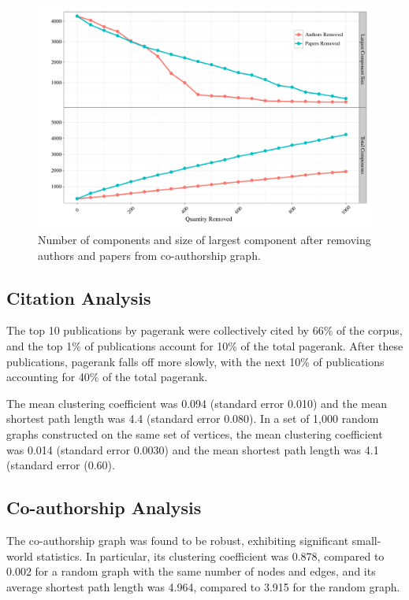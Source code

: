 \documentclass[5p]{elsarticle}
\begin{document}
\begin{figure}
  \begin{center}
    \includegraphics[width=\linewidth]{figures/connected_after_removing}%
    \caption{Number of components and size of largest component after removing authors and papers from co-authorship graph.
        \label{fig:connected_after_removing}
    }
  \end{center}
\end{figure}

\subsection{Citation Analysis} 
The top 10 publications by pagerank were collectively cited by 66\% of the
corpus, and the top 1\% of publications account for 10\% of the total
pagerank.  After these publications, pagerank falls off more slowly, with
the next 10\% of publications accounting for 40\% of the total pagerank. 

The mean clustering coefficient was 0.094 (standard error 0.010) and the
mean shortest path length was 4.4 (standard error 0.080). In a set of
1,000 random graphs constructed on the same set of vertices, the mean
clustering coefficient was 0.014 (standard error 0.0030) and the mean
shortest path length was 4.1 (standard error (0.60).

\subsection{Co-authorship Analysis} The co-authorship graph was found to
be robust, exhibiting significant small-world statistics. In particular,
its clustering coefficient was 0.878, compared to 0.002 for a random graph
with the same number of nodes and edges, and its average shortest path
length was 4.964, compared to 3.915 for the random graph.
\end{document}
